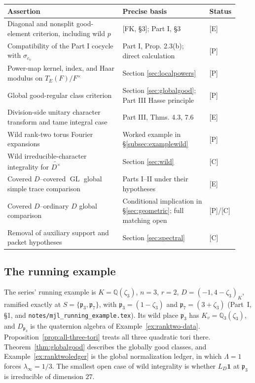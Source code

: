 \documentclass[11pt]{article}
\newcommand{\GL}{\operatorname{GL}}
\theoremstyle{plain}
\theoremstyle{definition}
\begin{document}
\begin{center}\small
\begin{tabular}{@{}p{0.49\linewidth}p{0.37\linewidth}p{0.07\linewidth}@{}}
\toprule
Assertion & Precise basis & Status\\\midrule
Diagonal and nonsplit good-element criterion, including wild $p$ & [FK, \S3]; Part I, \S3 & [E]\\
Compatibility of the Part I cocycle with $\sigma_{c_v}$ & Part I, Prop. 2.3(b); direct calculation & [P]\\
Power-map kernel, index, and Haar modulus on $T_E(F)/F^\times$ & Section \ref{sec:localpowers} & [P]\\
Global good-regular class criterion & Section \ref{sec:globalgood}; Part III Hasse principle & [P]\\
Division-side unitary character transform and tame integral case & Part III, Thms. 4.3, 7.6 & [E]\\
Wild rank-two torus Fourier expansions & Worked example in \S\ref{subsec:examplewild} & [P]\\
Wild irreducible-character integrality for $\widetilde{D^\times}$ & Section \ref{sec:wild} & [C]\\
Covered $D$--covered $\GL$ global simple trace comparison & Parts I--II under their hypotheses & [E]\\
Covered $D$--ordinary $D$ global comparison & Conditional implication in \S\ref{sec:geometric}; full matching open & [P]/[C]\\
Removal of auxiliary support and packet hypotheses & Section \ref{sec:spectral} & [C]\\
\bottomrule
\end{tabular}
\end{center}

\subsection*{The running example}
The series' running example is $K=\mathbb{Q}(\zeta_3)$, $n=3$, $r=2$, $D=(-1,4-\zeta_3)_K$, ramified exactly at $S=\{\mathfrak p_3,\mathfrak p_7\}$, with $\mathfrak p_3=(1-\zeta_3)$ and $\mathfrak p_7=(3+\zeta_3)$ (Part~I, \S1, and \texttt{notes/mjl\_running\_example.tex}). Its wild place $\mathfrak p_3$ has $K_v=\mathbb{Q}_3(\zeta_3)$, and $D_{\mathfrak p_3}$ is the quaternion algebra of Example~\ref{ex:ranktwo-data}. Proposition~\ref{prop:all-three-tori} treats all three quadratic tori there. Theorem~\ref{thm:globalgood} describes the globally good classes, and Example~\ref{ex:ranktwoledger} is the global normalization ledger, in which $\Lambda=1$ forces $\lambda_\infty=1/3$. The smallest open case of wild integrality is whether $L_D\mathbf 1$ at $\mathfrak p_3$ is irreducible of dimension $27$.
\end{document}
